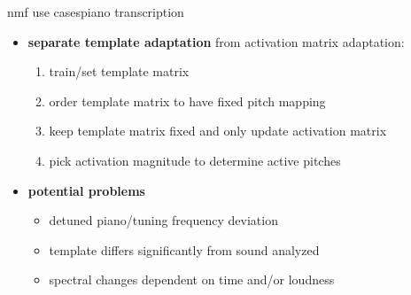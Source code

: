         \begin{frame}{nmf use cases}{piano transcription}
            \begin{itemize}
                \item   \textbf{separate template adaptation} from activation matrix adaptation:
                    \begin{enumerate}
                        \item  train/set template matrix
                        \item  order template matrix to have fixed pitch mapping
                        \item  keep template matrix fixed and only update activation matrix
                        \item  pick activation magnitude to determine active pitches
                    \end{enumerate}
                \bigskip
                \item   \textbf{potential problems}
                    \begin{itemize}
                        \item   detuned piano/tuning frequency deviation
                        \item   template differs significantly from sound analyzed
												\item	  spectral changes dependent on time and/or loudness
                    \end{itemize}
            \end{itemize}
        \end{frame}
        
